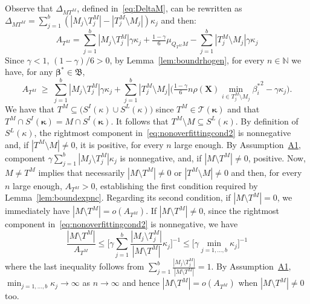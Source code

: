 \documentclass[
  12pt]{article}
\newcommand{\N}{\mathbb{N}}
\newcommand{\T}{\mathcal{T}}
\newcommand{\bbeta}{\boldsymbol{\beta}}
\newcommand{\bX}{\mathbf{X}}
\newcommand{\bB}{\mathfrak{B}}
\newcommand{\bkappa}{\boldsymbol{\kappa}}
\begin{document}
Observe that $\Delta_{MT^M}$, defined in~\eqref{eq:DeltaM}, can be rewritten as $\Delta_{MT^M}=\sum_{j=1}^b(|M_j\setminus T^M_j|-|T^M_j\setminus M_j|)\kappa_j$ and then:
$$ A_{T^M}=\sum_{j=1}^b|M_j\setminus T^M_j|\gamma\kappa_j+\tfrac{1-\gamma}{6}\mu_{Q_{T^M}M}-\sum_{j=1}^b|T^M_j\setminus M_j|\gamma\kappa_j $$
Since $\gamma <1$, $(1-\gamma)/6 >0$, by  Lemma~\ref{lem:boundrhogen}, for every $n\in \N$ we have, for any $\bbeta^*\in \bB$,
\begin{equation}\label{eq:nonoverfittingcond2}
   A_{T^M}\;\geq\; \sum_{j=1}^b|M_j \setminus T^M_j|\gamma\kappa_j + \sum_{j=1}^b |T^M_j\setminus M_j |\Big(\tfrac{1-\gamma}{6} n \rho(\bX) \min_{i\in T^M_j\setminus M_j}{\beta^*_i}^{2} - \gamma\kappa_j\Big).
\end{equation} 
We have that $T^M\subseteq \big(S^I(\kappa) \cup S^L(\kappa)\big)$ since $T^M\in\T(\bkappa)$ and that $T^M\cap S^{I}(\bkappa) = M\cap S^{I}(\bkappa)$. It follows that $T^M\setminus M \subseteq S^L(\kappa)$. By definition of $S^L(\kappa)$, the rightmost component in~\eqref{eq:nonoverfittingcond2} is nonnegative and, if $|T^M\setminus M|\neq0$, it is positive, for every $n$ large enough. By Assumption~\hyperlink{lab:A1}{A1}, component $\gamma\sum_{j=1}^b|M_j \setminus T^M_j|\kappa_j$ is nonnegative, and, if $|M\setminus T^M|\neq0$, positive. Now, $M\neq T^M$ implies that necessarily $|M\setminus T^M|\neq0$ or $|T^M\setminus M|\neq0$ and then, for every $n$ large enough, $A_{T^M}>0$, establishing the first condition required by Lemma~\ref{lem:boundexpnc}. Regarding its second condition, if $|M\setminus T^M|=0$, we immediately have $|M\setminus T^M|=o(A_{T^M})$. If $|M\setminus T^M|\neq 0$, since the rightmost component in~\eqref{eq:nonoverfittingcond2} is nonnegative, we have
$$\frac{|M\setminus T^M|}{A_{T^M}}\leq \bigg[ \gamma\sum_{j=1}^b\frac{|M_j \setminus T^M_j|}{|M\setminus T^M|}\kappa_j \bigg]^{-1} \leq \bigg[ \gamma\min_{j=1,\ldots,b}\kappa_j \bigg]^{-1} $$
where the last inequality follows from $\sum_{j=1}^b\frac{|M_j \setminus T^M_j|}{|M\setminus T^M|}=1$. By Assumption~\hyperlink{lab:A1}{A1}, $\min_{j=1,\ldots,b}\kappa_j\to \infty$ as $n\to\infty$ and hence $|M\setminus T^M|=o(A_{T^M})$ when $|M\setminus T^M|\neq 0$ too.
\end{document}
